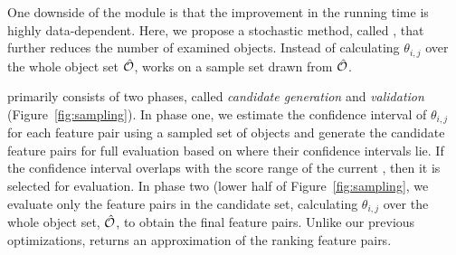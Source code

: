 One downside of the \earlyT module
is that the improvement in the running time is highly data-dependent.
Here, we propose a stochastic method, called \sampling,
that further reduces the number of examined objects.
Instead of calculating $\theta_{i,j}$ over the
whole object set $\hat{{\mathcal{O}}}$, \sampling works on a
sample set drawn from $\hat{{\mathcal{O}}}$.

 \sampling primarily consists of two phases,
called {\em candidate generation} and {\em validation}
(Figure~\ref{fig:sampling}).
In phase one, we estimate the confidence interval of $\theta_{i,j}$
for each feature pair using a sampled set of objects and
generate the candidate feature pairs for full evaluation
based on where their confidence intervals lie.
If the confidence interval overlaps with the
score range of the current \topk, then it is selected for evaluation.
In phase two (lower half of Figure~\ref{fig:sampling},
we evaluate only the feature pairs in the candidate set,
calculating $\theta_{i,j}$ over the whole object set, $\hat{{\mathcal{O}}}$,
to obtain the final \topk feature pairs.
Unlike our previous optimizations, \sampling returns
an approximation of the \topk ranking feature pairs.



